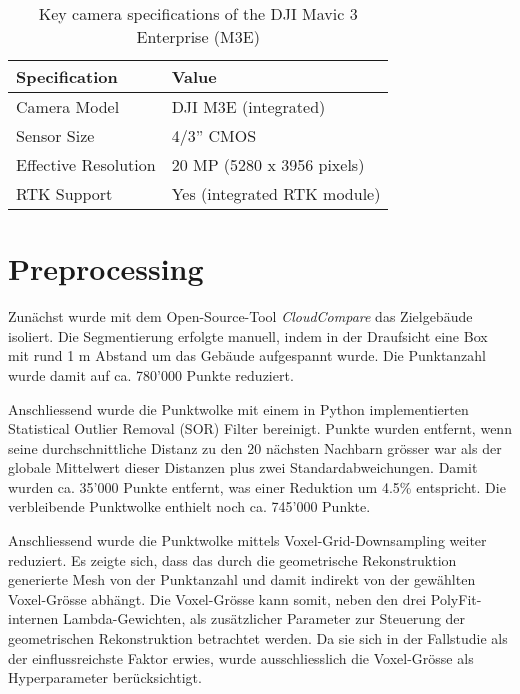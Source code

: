 \begin{table}[h!]
    \centering
    \begin{tabular}{|l|l|}
    \hline
    \textbf{Specification} & \textbf{Value} \\
    \hline
    Camera Model & DJI M3E (integrated) \\
    Sensor Size & 4/3'' CMOS \\
    Effective Resolution & 20 MP (5280 x 3956 pixels) \\
    RTK Support & Yes (integrated RTK module) \\
    \hline
    \end{tabular}
    \label{tab:m3e_camera_specs}
    \caption{Key camera specifications of the DJI Mavic 3 Enterprise (M3E) \cite{SpecsDJIMavic}}
\end{table}


\section{Preprocessing}
\begin{German}
    Zunächst wurde mit dem Open-Source-Tool \textit{CloudCompare} das Zielgebäude isoliert. Die Segmentierung erfolgte manuell, indem in der Draufsicht eine Box mit rund 1 m Abstand um das Gebäude aufgespannt wurde. Die Punktanzahl wurde damit auf ca. 780'000 Punkte reduziert.

    Anschliessend wurde die Punktwolke mit einem in Python implementierten Statistical Outlier Removal (SOR) Filter bereinigt. Punkte wurden entfernt, wenn seine durchschnittliche Distanz zu den 20 nächsten Nachbarn grösser war als der globale Mittelwert dieser Distanzen plus zwei Standardabweichungen. Damit wurden ca. 35'000 Punkte entfernt, was einer Reduktion um 4.5\% entspricht. Die verbleibende Punktwolke enthielt noch ca. 745'000 Punkte.

    Anschliessend wurde die Punktwolke mittels Voxel-Grid-Downsampling weiter reduziert. Es zeigte sich, dass das durch die geometrische Rekonstruktion generierte Mesh von der Punktanzahl und damit indirekt von der gewählten Voxel-Grösse abhängt. Die Voxel-Grösse kann somit, neben den drei PolyFit-internen Lambda-Gewichten, als zusätzlicher Parameter zur Steuerung der geometrischen Rekonstruktion betrachtet werden. Da sie sich in der Fallstudie als der einflussreichste Faktor erwies, wurde ausschliesslich die Voxel-Grösse als Hyperparameter berücksichtigt.
\end{German}

